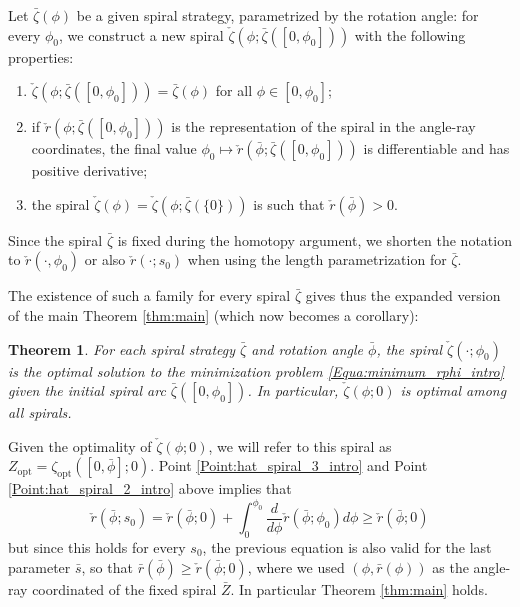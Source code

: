 \documentclass[reqno]{amsart}
\theoremstyle{definition} \newtheorem{definition}{Definition}[section]
\theoremstyle{definition} \newtheorem{remark}[definition]{Remark}
\theoremstyle{plain} \newtheorem{lemma}[definition]{Lemma}
\theoremstyle{plain} \newtheorem{proposition}[definition]{Proposition}
\theoremstyle{plain} \newtheorem{theorem}[definition]{Theorem}
\theoremstyle{plain} \newtheorem{corollary}[definition]{Corollary}
\theoremstyle{definition} \newtheorem{example}[definition]{Example}
\theoremstyle{plain} \newtheorem{claim}[clai]{Claim}
\theoremstyle{definition} \newtheorem{assumption}[definition]{Assumption}
\theoremstyle{definition} \newtheorem{observation}[definition]{Observation}
\newcommand{\1}{\mathbbm 1}
\numberwithin{equation}{section} %
\theoremstyle{plain} \newtheorem*{theorem*}{Theorem}
\theoremstyle{plain} \newtheorem{mthm}[maintheorem]{Main Theorem}
\theoremstyle{plain} \newtheorem*{mthm*}{Main Theorem}
\theoremstyle{plain} \newtheorem*{conjecture*}{Conjecture}
\theoremstyle{plain} \newtheorem{conjecture}[definition]{Conjecture}
\theoremstyle{plain} \newtheorem*{problem*}{Problem}
\begin{document}
 Let $\bar \zeta(\phi)$ be a given spiral strategy, parametrized by the rotation angle: for every $\phi_0$, we construct a new spiral $\check\zeta(\phi;\bar \zeta([0,\phi_0]))$ with the following properties:
\begin{enumerate}
\item $\check\zeta(\phi;\bar \zeta([0,\phi_0])) = \bar \zeta(\phi)$ for all $\phi \in [0,\phi_0]$;
\item \label{Point:hat_spiral_2_intro} if $\check r(\phi;\bar \zeta([0,\phi_0]))$ is the representation of the spiral in the angle-ray coordinates, the final value $\phi_0 \mapsto \check r(\bar \phi;\bar \zeta([0,\phi_0]))$ is differentiable and has positive derivative;
\item \label{Point:hat_spiral_3_intro} the spiral $\check \zeta (\phi)= \check \zeta(\phi;\bar \zeta(\{0\}))$ is such that $\check r(\bar \phi) > 0$.
\end{enumerate}
Since the spiral $\bar \zeta$ is fixed during the homotopy argument, we shorten the notation to $\check r(\cdot,\phi_0)$ or also $\check r(\cdot;s_0)$ when using the length parametrization for $\bar \zeta$. 

The existence of such a family for every spiral $\bar\zeta$ gives thus the expanded version of the main Theorem \ref{thm:main} (which now becomes a corollary):

\begin{theorem}
\label{Theo:main_extended}
For each spiral strategy $\bar \zeta$ and rotation angle $\bar \phi$, the spiral $\check \zeta(\cdot;\phi_0)$ is the optimal solution to the minimization problem \eqref{Equa:minimum_rphi_intro} given the initial spiral arc $\bar \zeta([0,\phi_0])$. In particular, $\check \zeta(\phi;0)$ is optimal among all spirals.
\end{theorem}

Given the optimality of $\check \zeta(\phi;0)$, we will refer to this spiral as $Z_\mathrm{opt} = \zeta_{\text{opt}}([0,\bar \phi];0)$.
Point \eqref{Point:hat_spiral_3_intro} and Point \eqref{Point:hat_spiral_2_intro} above implies that
\begin{equation*}
\check r(\bar\phi;s_0)=\check r(\bar\phi;0)+\int_0^{\phi_0} \frac{d}{d\phi} \check r(\bar \phi;\phi_0) d\phi \geq \check r(\bar\phi;0)
\end{equation*}
but since this holds for every $s_0$, the previous equation is also valid for the last parameter $\bar s$, so that $\bar r(\bar\phi)\geq\check r(\bar\phi;0)$,
where we used $(\phi,\bar r(\phi))$ as the angle-ray coordinated of the fixed spiral $\bar Z$. In particular Theorem \ref{thm:main} holds.
\end{document}
